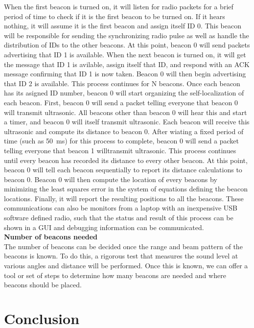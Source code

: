\documentclass{article}
\begin{document}
      When the first beacon is turned on, it will listen for radio packets for a brief period of time to check if it is the first beacon to be turned on. If it hears nothing, it will assume it is the first beacon and assign itself ID 0. This beacon will be responsible for sending the synchronizing radio pulse as well as handle the distribution of IDs to the other beacons. At this point, beacon 0 will send packets advertising that ID 1 is available. When the next beacon is turned on, it will get the message that ID 1 is avilable, assign itself that ID, and respond with an ACK message confirming that ID 1 is now taken. Beacon 0 will then begin advertising that ID 2 is available. This process continues for N beacons. Once each beacon has its asigned ID number, beacon 0 will start organizing the self-localization of each beacon. First, beacon 0 will send a packet telling everyone that beacon 0 will transmit ultrasonic. All beacons other than beacon 0 will hear this and start a timer, and beacon 0 will itself transmit ultrasonic. Each beacon will receive this ultrasonic and compute its distance to beacon 0. After wiating a fixed period of time (such as \SI{50}{\milli\second}) for this process to complete, beacon 0 will send a packet telling everyone that beacon 1 willtransmit ultrasonic. This process continues until every beacon has recorded its distance to every other beacon. At this point, beacon 0 will tell each beacon sequentially to report its distance calculations to beacon 0. Beacon 0 will then compute the location of every beacons by minimizing the least squares error in the system of equations defining the beacon locations. Finally, it will report the resulting positions to all the beacons. These communications can also be monitors from a laptop with an inexpensive USB software defined radio, such that the status and result of this process can be shown in a GUI and debugging information can be communicated. \\

      \textbf{Number of beacons needed} \\
      The number of beacons can be decided once the range and beam pattern of the beacons is known. To do this, a rigorous test that measures the sound level at various angles and distance will be performed. Once this is known, we can offer a tool or set of steps to determine how many beacons are needed and where beacons should be placed.


\section{Conclusion} \label{conclusion}
\end{document}
